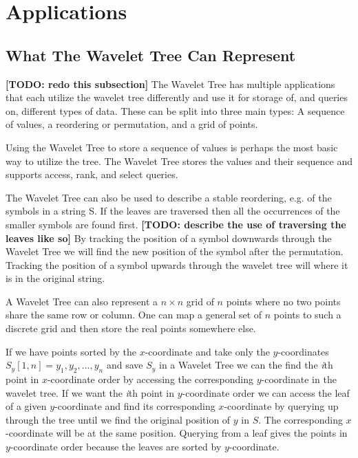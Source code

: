 \section{Applications}
\subsection{What The Wavelet Tree Can Represent}
\textbf{[TODO: redo this subsection]}
The Wavelet Tree has multiple applications that each utilize the wavelet tree differently and use it for storage of, and queries on, different types of data.
These can be split into three main types: A sequence of values, a reordering or permutation, and a grid of points.

Using the Wavelet Tree to store a sequence of values is perhaps the most basic way to utilize the tree.
The Wavelet Tree stores the values and their sequence and supports access, rank, and select queries.

The Wavelet Tree can also be used to describe a stable reordering, e.g. of the symbols in a string S. 
If the leaves are traversed then all the occurrences of the smaller symbols are found first. \textbf{[TODO: describe the use of traversing the leaves like so]}
By tracking the position of a symbol downwards through the Wavelet Tree we will find the new position of the symbol after the permutation.
Tracking the position of a symbol upwards through the wavelet tree will where it is in the original string. 

A Wavelet Tree can also represent a $n \times n$ grid of $n$ points where no two points share the same row or column. 
One can map a general set of $n$ points to such a discrete grid and then store the real points somewhere else.

If we have points sorted by the $x$-coordinate and take only the $y$-coordinates $S_y[1,n] = y_1,y_2,...,y_n$ and save $S_y$ in a Wavelet Tree we can the find the \textit{i}th point in $x$-coordinate order by accessing the corresponding $y$-coordinate in the wavelet tree. 
If we want the \textit{i}th point in $y$-coordinate order we can access the leaf of a given $y$-coordinate and find its corresponding $x$-coordinate by querying up through the tree until we find the original position of $y$ in $S$. 
The corresponding $x$-coordinate will be at the same position.
Querying from a leaf gives the points in $y$-coordinate order because the leaves are sorted by $y$-coordinate.

